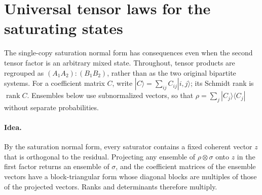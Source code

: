 \section{Universal tensor laws for the saturating states}
\label{sec:universal-tensor}

The single-copy saturation normal form has consequences even when the
second tensor factor is an arbitrary mixed state. Throughout, tensor
products are regrouped as $(A_1A_2):(B_1B_2)$, rather than as the two
original bipartite systems. For a coefficient matrix $C$, write
$|C\rangle=\sum_{ij}C_{ij}|i,j\rangle$; its Schmidt rank is $\operatorname{rank}C$.
Ensembles below use subnormalized vectors, so that
$\rho=\sum_j|C_j\rangle\langle C_j|$ without separate probabilities.

\paragraph{Idea.} By the saturation normal form, every saturator contains a
fixed coherent vector $z$ that is orthogonal to the residual. Projecting any
ensemble of $\rho\otimes\sigma$ onto $z$ in the first factor returns an
ensemble of $\sigma$, and the coefficient matrices of the ensemble vectors
have a block-triangular form whose diagonal blocks are multiples of those of
the projected vectors. Ranks and determinants therefore multiply.

